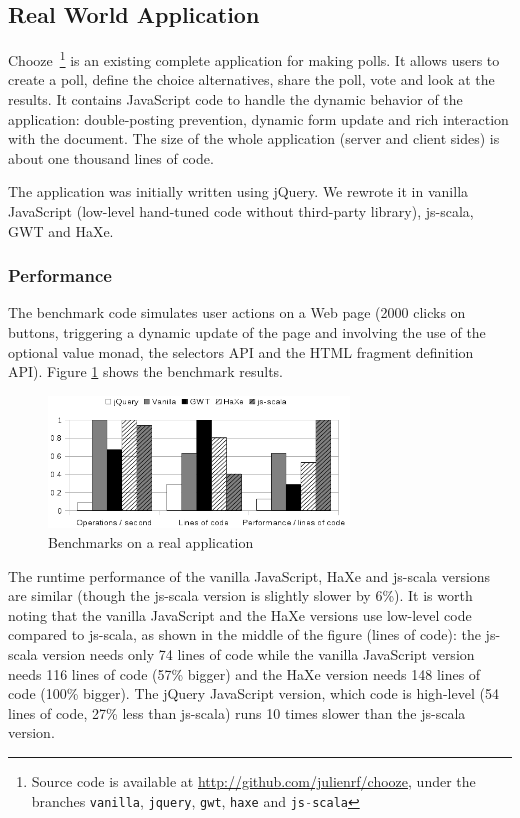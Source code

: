 \documentclass{llncs}
\newcommand{\code}[1]{\lstinline[language=Scala,columns=fixed,basicstyle=\footnotesize]|#1|}
\begin{document}
\subsection{Real World Application}

Chooze~\footnote{Source code is available at
\href{http://github.com/julienrf/chooze}{http://github.com/julienrf/chooze}, under the branches \code{vanilla}, \code{jquery}, \code{gwt}, \code{haxe} and \code{js-scala}} is an existing
complete application for making polls. It allows users to create a poll, define the choice
alternatives, share the poll, vote and look at the results. It contains JavaScript code to handle
the dynamic behavior of the application: double-posting prevention, dynamic form update and rich
interaction with the document. The size of the whole application (server and client sides) is about one thousand lines of code.

The application was initially written using jQuery. We rewrote it in vanilla JavaScript (low-level
hand-tuned code without third-party library), js-scala, GWT and HaXe.

\subsubsection{Performance}

The benchmark code simulates user actions on a Web page (2000 clicks on buttons, triggering a
dynamic update of the page and involving the use of the optional value monad, the selectors API and
the HTML fragment definition API). Figure \ref{benchmark} shows the benchmark results.

\begin{figure}
\centering
\includegraphics[width=8cm]{gpce19c-foy-chooze.png}
\caption{Benchmarks on a real application}
\label{benchmark}
\end{figure}

The runtime performance of the vanilla JavaScript, HaXe and js-scala versions are similar (though
the js-scala version is slightly slower by 6\%). It is worth noting that the vanilla JavaScript and
the HaXe versions use low-level code compared to js-scala, as shown in the middle of the figure
(lines of code): the js-scala version needs only 74 lines of code while the vanilla JavaScript
version needs 116 lines of code (57\% bigger) and the HaXe version needs 148 lines of code (100\%
bigger). The jQuery JavaScript version, which code is high-level (54 lines of code, 27\% less
than js-scala) runs 10 times slower than the js-scala version.
\end{document}

